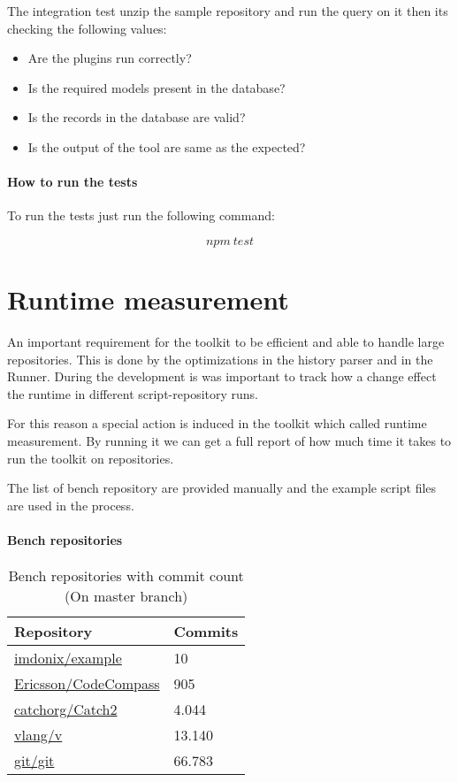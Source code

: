 The integration test unzip the sample repository and run the query on it then its checking the following values:

\begin{itemize}
	\item Are the plugins run correctly?
	\item Is the required models present in the database?
	\item Is the records in the database are valid?
	\item Is the output of the tool are same as the expected?
\end{itemize}

\subsubsection{How to run the tests}

To run the tests just run the following command:

\[ npm\ test \]


\chapter{Runtime measurement}
\label{appx:simulation}

An important requirement for the toolkit to be efficient and able to handle large repositories. This is done by the optimizations in the history parser and in the Runner. During the development is was important to track how a change effect the runtime in different script-repository runs.   

For this reason a special action is induced in the toolkit which called runtime measurement. By running it we can get a full report of how much time it takes to run the toolkit on repositories.

The list of bench repository are provided manually and the example script files are used in the process.

\subsubsection{Bench repositories}

\begin{table}[H]
	\centering
	\begin{tabular}{ | m{} | m{} | }
		\hline
		\textbf{Repository} & \textbf{Commits} \\
		\hline \hline
		\href{https://github.com/imdonix/example}{imdonix/example} & 10 \\
		\hline
		\href{https://github.com/Ericsson/CodeCompass}{Ericsson/CodeCompass} & 905 \\
		\hline
		\href{https://github.com/catchorg/Catch2}{catchorg/Catch2} & 4.044 \\
		\hline
		\href{https://github.com/vlang/v}{vlang/v} & 13.140 \\
		\hline
		\href{https://github.com/git/git}{git/git} & 66.783 \\
		\hline
	\end{tabular}
	\caption{Bench repositories with commit count (On master branch)}
	\label{tab:runtime}
\end{table}

